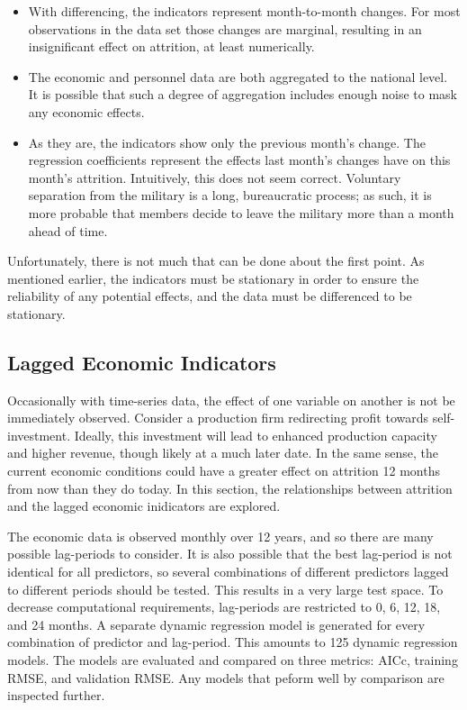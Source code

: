 \documentclass[12pt,letterpaper,toc=flat,oneside]{report}
\theoremstyle{definition}
\theoremstyle{definition}
\theoremstyle{definition}
\theoremstyle{remark}
\begin{document}
\begin{itemize}
\item
  With differencing, the indicators represent month-to-month changes.
  For most observations in the data set those changes are marginal,
  resulting in an insignificant effect on attrition, at least
  numerically.
\item
  The economic and personnel data are both aggregated to the national
  level. It is possible that such a degree of aggregation includes
  enough noise to mask any economic effects.
\item
  As they are, the indicators show only the previous month's change. The
  regression coefficients represent the effects last month's changes
  have on this month's attrition. Intuitively, this does not seem
  correct. Voluntary separation from the military is a long,
  bureaucratic process; as such, it is more probable that members decide
  to leave the military more than a month ahead of time.
\end{itemize}

Unfortunately, there is not much that can be done about the first point.
As mentioned earlier, the indicators must be stationary in order to
ensure the reliability of any potential effects, and the data must be
differenced to be stationary.

\hypertarget{lagged-economic-indicators}{%
\subsection{Lagged Economic
Indicators}\label{lagged-economic-indicators}}

Occasionally with time-series data, the effect of one variable on
another is not be immediately observed. Consider a production firm
redirecting profit towards self-investment. Ideally, this investment
will lead to enhanced production capacity and higher revenue, though
likely at a much later date. In the same sense, the current economic
conditions could have a greater effect on attrition 12 months from now
than they do today. In this section, the relationships between attrition
and the lagged economic inidicators are explored.

The economic data is observed monthly over 12 years, and so there are
many possible lag-periods to consider. It is also possible that the best
lag-period is not identical for all predictors, so several combinations
of different predictors lagged to different periods should be tested.
This results in a very large test space. To decrease computational
requirements, lag-periods are restricted to 0, 6, 12, 18, and 24 months.
A separate dynamic regression model is generated for every combination
of predictor and lag-period. This amounts to 125 dynamic regression
models. The models are evaluated and compared on three metrics: AICc,
training RMSE, and validation RMSE. Any models that peform well by
comparison are inspected further.
\end{document}
